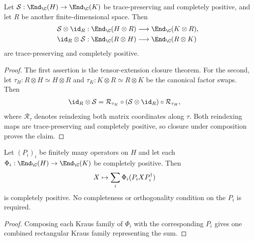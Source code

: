 \begin{lemma}
    \label{thm:mpdo_tensor_map_id_cptp}
    \leanok

    Let $\mathcal S:\End_{\C}(H)\to
        \End_{\C}(K)$ be trace-preserving and completely positive,
    and let $R$ be another finite-dimensional space. Then
    \begin{align}
        \mathcal S\otimes\id_R:
        \End_{\C}(H\otimes R) & \longrightarrow
        \End_{\C}(K\otimes R),
        \notag                                  \\
        \id_R\otimes\mathcal S:
        \End_{\C}(R\otimes H) & \longrightarrow
        \End_{\C}(R\otimes K)
        \notag
    \end{align}
    are trace-preserving and completely positive.
\end{lemma}
\begin{proof}
    \leanok
    The first assertion is the tensor-extension closure theorem. For the
    second, let $\tau_H:R\otimes H\simeq H\otimes R$ and
    $\tau_K:K\otimes R\simeq R\otimes K$ be the canonical factor swaps. Then
    \begin{align}
        \id_R\otimes\mathcal S
         & =\mathcal R_{\tau_K}\circ
        (\mathcal S\otimes\id_R)\circ\mathcal R_{\tau_H},
        \notag
    \end{align}
    where $\mathcal R_\tau$ denotes reindexing both matrix coordinates along
    $\tau$. Both reindexing maps are trace-preserving and completely positive,
    so closure under composition proves the claim.
\end{proof}


\begin{lemma}
    \label{lem:mpdo_compressed_cp_sum}
    \leanok

    Let $(P_i)_i$ be finitely many operators on $H$ and let each
    $\Phi_i:\End_{\C}(H)\to\End_{\C}(K)$ be completely positive. Then
    \begin{align}
        X & \mapsto\sum_i\Phi_i(P_iXP_i^\dagger)
        \notag
    \end{align}
    is completely positive. No completeness or orthogonality condition on
    the $P_i$ is required.
\end{lemma}
\begin{proof}\leanok

    Composing each Kraus family of $\Phi_i$ with the corresponding $P_i$
    gives one combined rectangular Kraus family representing the sum.
\end{proof}

